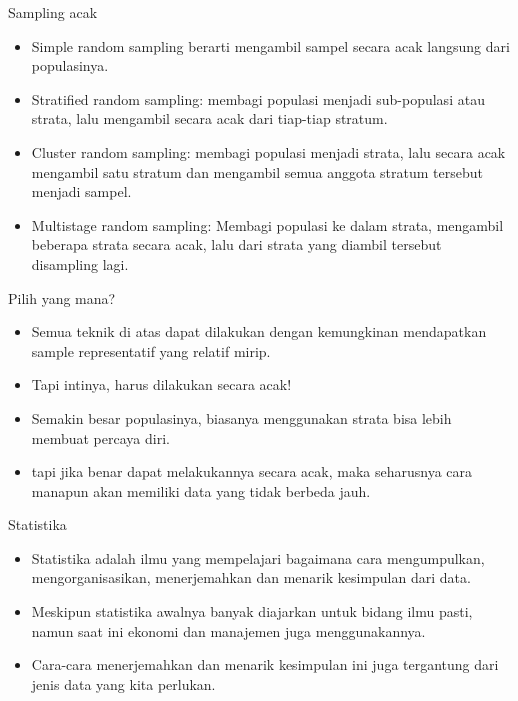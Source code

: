 \documentclass[
  ignorenonframetext,
]{beamer}
\begin{document}
\begin{frame}{Sampling acak}
\label{sampling-acak}
\begin{itemize}
\item
  Simple random sampling berarti mengambil sampel secara acak langsung
  dari populasinya.
\item
  Stratified random sampling: membagi populasi menjadi sub-populasi atau
  strata, lalu mengambil secara acak dari tiap-tiap stratum.
\item
  Cluster random sampling: membagi populasi menjadi strata, lalu secara
  acak mengambil satu stratum dan mengambil semua anggota stratum
  tersebut menjadi sampel.
\item
  Multistage random sampling: Membagi populasi ke dalam strata,
  mengambil beberapa strata secara acak, lalu dari strata yang diambil
  tersebut disampling lagi.
\end{itemize}
\end{frame}

\begin{frame}{Pilih yang mana?}
\label{pilih-yang-mana}
\begin{itemize}
\item
  Semua teknik di atas dapat dilakukan dengan kemungkinan mendapatkan
  sample representatif yang relatif mirip.
\item
  Tapi intinya, harus dilakukan secara acak!
\item
  Semakin besar populasinya, biasanya menggunakan strata bisa lebih
  membuat percaya diri.
\item
  tapi jika benar dapat melakukannya secara acak, maka seharusnya cara
  manapun akan memiliki data yang tidak berbeda jauh.
\end{itemize}
\end{frame}

\begin{frame}{Statistika}
\label{statistika}
\begin{itemize}
\item
  Statistika adalah ilmu yang mempelajari bagaimana cara mengumpulkan,
  mengorganisasikan, menerjemahkan dan menarik kesimpulan dari data.
\item
  Meskipun statistika awalnya banyak diajarkan untuk bidang ilmu pasti,
  namun saat ini ekonomi dan manajemen juga menggunakannya.
\item
  Cara-cara menerjemahkan dan menarik kesimpulan ini juga tergantung
  dari jenis data yang kita perlukan.
\end{itemize}
\end{frame}
\end{document}

